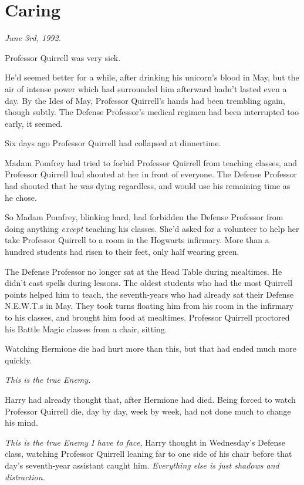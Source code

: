 \chapter{Caring}\label{caring}

\emph{June 3rd, 1992.}

Professor Quirrell was very sick.

He'd seemed better for a while, after drinking his unicorn's blood in
May, but the air of intense power which had surrounded him afterward
hadn't lasted even a day. By the Ides of May, Professor Quirrell's hands
had been trembling again, though subtly. The Defense Professor's medical
regimen had been interrupted too early, it seemed.

Six days ago Professor Quirrell had collapsed at dinnertime.

Madam Pomfrey had tried to forbid Professor Quirrell from teaching
classes, and Professor Quirrell had shouted at her in front of everyone.
The Defense Professor had shouted that he was dying regardless, and
would use his remaining time as he chose.

So Madam Pomfrey, blinking hard, had forbidden the Defense Professor
from doing anything \emph{except} teaching his classes. She'd asked for
a volunteer to help her take Professor Quirrell to a room in the
Hogwarts infirmary. More than a hundred students had risen to their
feet, only half wearing green.

The Defense Professor no longer sat at the Head Table during mealtimes.
He didn't cast spells during lessons. The oldest students who had the
most Quirrell points helped him to teach, the seventh-years who had
already sat their Defense N.E.W.T.s in May. They took turns floating him
from his room in the infirmary to his classes, and brought him food at
mealtimes. Professor Quirrell proctored his Battle Magic classes from a
chair, sitting.

Watching Hermione die had hurt more than this, but that had ended much
more quickly.

\emph{This is the true Enemy.}

Harry had already thought that, after Hermione had died. Being forced to
watch Professor Quirrell die, day by day, week by week, had not done
much to change his mind.

\emph{This is the true Enemy I have to face,} Harry thought in
Wednesday's Defense class, watching Professor Quirrell leaning far to
one side of his chair before that day's seventh-year assistant caught
him. \emph{Everything else is just shadows and distraction.}


